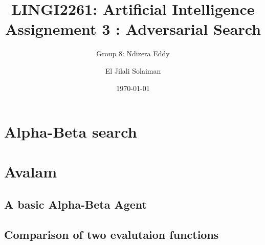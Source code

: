 \documentclass[10pt,a4paper]{article}
\begin{document}
\title{LINGI2261: Artificial Intelligence \\
Assignement 3 : Adversarial Search}
\author{Group 8: Ndizera Eddy \and El Jilali Solaiman}
\date{\today}
\maketitle

\section{Alpha-Beta search}

\section{Avalam}

\subsection{A basic Alpha-Beta Agent}

\subsection{Comparison of two evalutaion functions}
\end{document}
